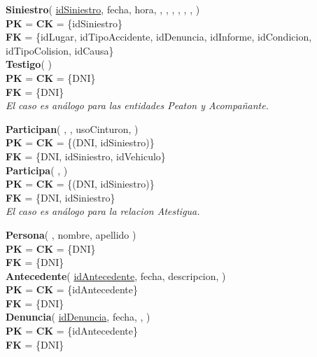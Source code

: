 \textbf{Siniestro}(
    \uline{idSiniestro},
    fecha,
    hora,
    ,
    ,
    ,
    ,
    ,
    ,
)\\
\textbf{PK} = \textbf{CK} = \{idSiniestro\}\\
\textbf{FK} = \{idLugar, idTipoAccidente, idDenuncia, idInforme, idCondicion, idTipoColision, idCausa\}\\

\textbf{Testigo}(
)\\
\textbf{PK} = \textbf{CK} = \{DNI\}\\
\textbf{FK} = \{DNI\}\\
\textit{El caso es análogo para las entidades Peaton y Acompañante.}

\textbf{Participan}(
    ,
    ,
    usoCinturon,
)\\
\textbf{PK} = \textbf{CK} = \{(DNI, idSiniestro)\}\\
\textbf{FK} = \{DNI, idSiniestro, idVehiculo\}\\

\textbf{Participa}(
    ,
)\\
\textbf{PK} = \textbf{CK} = \{(DNI, idSiniestro)\}\\
\textbf{FK} = \{DNI, idSiniestro\}\\
\textit{El caso es análogo para la relacion Atestigua.}

\textbf{Persona}(
    ,
    nombre,
    apellido
)\\
\textbf{PK} = \textbf{CK} = \{DNI\}\\
\textbf{FK} = \{DNI\}\\

\textbf{Antecedente}(
    \uline{idAntecedente},
    fecha,
    descripcion,
)\\
\textbf{PK} = \textbf{CK} = \{idAntecedente\}\\
\textbf{FK} = \{DNI\}\\

\textbf{Denuncia}(
    \uline{idDenuncia},
    fecha,
    ,
)\\
\textbf{PK} = \textbf{CK} = \{idAntecedente\}\\
\textbf{FK} = \{DNI\}\\



